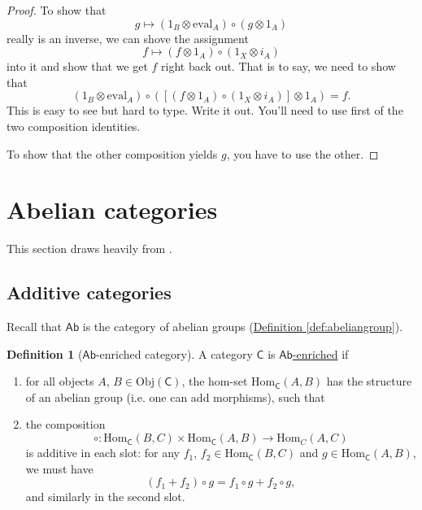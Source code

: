 \documentclass[a4paper,10pt]{scrreprt}
\newcommand{\defn}[1]{\ul{#1}}
\newcommand{\Obj}{\mathrm{Obj}}
\newcommand{\Hom}{\mathrm{Hom}}
\newcommand{\ev}{\mathrm{eval}}
\theoremstyle{definition}
\newtheorem{definition}{Definition}[section]
\theoremstyle{plain}
\theoremstyle{remark}
\begin{document}
\begin{proof}
  To show that 
  \begin{equation*}
    g \mapsto (1_{B} \otimes \ev_{A}) \circ (g \otimes 1_{A})
  \end{equation*}
  really is an inverse, we can shove the assignment
  \begin{equation*}
    f \mapsto (f \otimes 1_{A}) \circ (1_{X} \otimes i_{A})
  \end{equation*}
  into it and show that we get $f$ right back out. That is to say, we need to show that
  \begin{equation*}
    (1_{B} \otimes \ev_{A}) \circ (\left[ (f \otimes 1_{A}) \circ (1_{X} \otimes i_{A}) \right] \otimes 1_{A}) = f.
  \end{equation*}
  This is easy to see but hard to type. Write it out. You'll need to use first of the two composition identities. 

  To show that the other composition yields $g$, you have to use the other.
\end{proof} 

\section{Abelian categories} \label{sec:abeliancategories}
This section draws heavily from \cite{EGNO-tensor-categories}.
\subsection{Additive categories}
Recall that $\mathsf{Ab}$ is the category of abelian groups (\hyperref[def:abeliangroup]{Definition \ref*{def:abeliangroup}}).
\begin{definition}[$\mathsf{Ab}$-enriched category]
  \label{def:abenrichedcategory}
  A category $\mathsf{C}$ is \defn{$\mathsf{Ab}$-enriched} if 
  \begin{enumerate}
    \item for all objects $A$, $B \in \Obj(\mathsf{C})$, the hom-set $\text{Hom}_{\mathsf{C}}(A, B)$ has the structure of an abelian group (i.e. one can add morphisms), such that

    \item the composition
      \begin{equation*}
        \circ\colon \Hom_{\mathsf{C}}(B, C) \times \Hom_{\mathsf{C}}(A, B) \to \Hom_{C}(A, C)
      \end{equation*}
      is additive in each slot: for any $f_{1}$, $f_{2} \in \Hom_{\mathsf{C}}(B, C)$ and $g \in \Hom_{\mathsf{C}}(A, B)$, we must have
      \begin{equation*}
        (f_{1} + f_{2}) \circ g = f_{1} \circ g + f_{2} \circ g,
      \end{equation*}
      and similarly in the second slot.
  \end{enumerate}
\end{definition}
\end{document}
